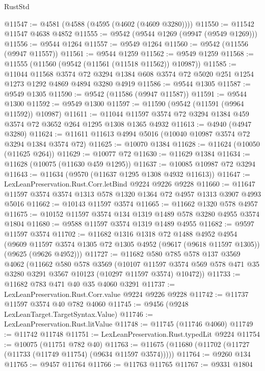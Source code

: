 \begin{lexlean}{RustStd}
\begin{coremodule}
@11547 := @4581 (@4588 (@4595 (@4602 (@4609 @3280))))
@11550 := @11542 @11547 @4638 @4852
@11555 := @9542 (@9544 @1269 (@9947 (@9549 @1269)))
@11556 := @9544 @1264
@11557 := @9549 @1264
@11560 := @9542 (@11556 (@9947 @11557))
@11561 := @9544 @1259
@11562 := @9549 @1259
@11568 := @11555 (@11560 (@9542 (@11561 (@11518 @11562)) @10987))
@11585 := @11044
    @11568
    @3574
    @72
    @3294
    @1384
    @608
    @3574
    @72
    @5020
    @251
    @1254
    @1273
    @1292
    @4869
    @4894
    @3280
    @4919
@11586 := @9544 @1305
@11587 := @9549 @1305
@11590 := @9542 (@11586 (@9947 @11587))
@11591 := @9544 @1300
@11592 := @9549 @1300
@11597 := @11590 (@9542 (@11591 (@9964 @11592)) @10987)
@11611 := @11044 @11597 @3574 @72 @3294 @1384 @459 @3574 @72 @3652 @264 @1295 @1308 @1365 @4932
@11613 := @4940 (@4947 @3280)
@11624 := @11611 @11613 @4994 @5016 (@10040 @10987 @3574 @72 @3294 @1384 @3574 @72)
@11625 := @10070 @1384
@11628 := @11624 (@10050 (@11625 @264))
@11629 := @10077 @72
@11630 := @11629 @1384
@11634 := @11628 (@10075 (@11630 @459 @1295))
@11637 := @10085 @10987 @72 @3294
@11643 := @11634 (@9570 (@11637 @1295 @1308 @4932 @11613))
@11647 := LexLeanPreservation.Rust.Corr.letBind @9224 @9226 @9228
@11660 := @11647 @11597 @3574 @3574 @1313 @578 @1320 @1364 @72 @4957 @1313 @3907 @4993 @5016
@11662 := @10143 @11597 @3574
@11665 := @11662 @1320 @578 @4957
@11675 := @10152 @11597 @3574 @134 @1319 @1489 @578 @3280 @4955 @3574 @1804
@11680 := @9588 @11597 @3574 @1319 @1489 @4955
@11682 := @9597 @11597 @3574
@11702 := @11682
    @1316
    @1318
    @72
    @1488
    @4952
    @4954
    (@9609 @11597 @3574 @1305 @72 @1305 @4952 (@9617 (@9618 @11597 @1305)) (@9625 (@9626 @4952)))
@11727 := @11682
    @580
    @785
    @578
    @137
    @3569
    @4062
    (@11662
      @580
      @578
      @3569
      (@10107
        @11597
        @3574
        @569
        @578
        @471
        @35
        @3280
        @3291
        @3567
        @10123
        (@10297 @11597 @3574)
        @10472))
@11733 := @11682 @783 @471 @40 @35 @4060 @3291
@11737 := LexLeanPreservation.Rust.Corr.value @9224 @9226 @9228
@11742 := @11737 @11597 @3574 @40 @782 @4060
@11745 := @9456 (@9248 LexLeanTarget.TargetSyntax.Value)
@11746 := LexLeanPreservation.Rust.litValue
@11748 := @11745 (@11746 @4060)
@11749 := @11742 @11748
@11751 := LexLeanPreservation.Rust.typedLit @9224
@11754 := @10075 (@11751 @782 @40)
@11763 := @11675 (@11680 (@11702 (@11727 (@11733 (@11749 @11754) (@9634 @11597 @3574)))))
@11764 := @9260 @134
@11765 := @9457 @11764
@11766 := @11763 @11765
@11767 := @9331 @1804

\end{coremodule}
\end{lexlean}
